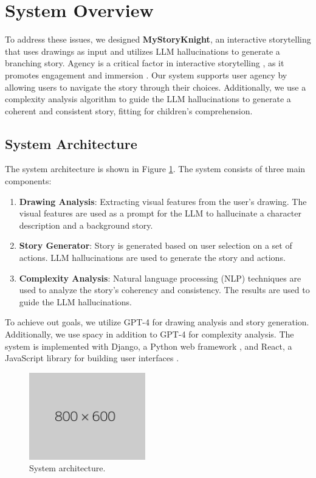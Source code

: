 \documentclass[submit,techrep,english]{ipsj}
\begin{document}
\section{System Overview}
\label{sec:system-overview}
To address these issues, we designed \textbf{MyStoryKnight}, an interactive storytelling that uses drawings as input and utilizes LLM hallucinations to generate a branching story. Agency is a critical factor in interactive storytelling \cite{11:LimaGV20}, as it promotes engagement and immersion \cite{12:ZhangXWYRWYWL22}. Our system supports user agency by allowing users to navigate the story through their choices. Additionally, we use a complexity analysis algorithm to guide the LLM hallucinations to generate a coherent and consistent story, fitting for children's comprehension.

\subsection{System Architecture}
\label{subsec:system-architecture}
The system architecture is shown in Figure \ref{fig:system-architecture}. The system consists of three main components:
\begin{enumerate}
    \item \textbf{Drawing Analysis}: Extracting visual features from the user's drawing. The visual features are used as a prompt for the LLM to hallucinate a character description and a background story.
    \item \textbf{Story Generator}: Story is generated based on user selection on a set of actions. LLM hallucinations are used to generate the story and actions.
    \item \textbf{Complexity Analysis}: Natural language processing (NLP) techniques are used to analyze the story's coherency and consistency. The results are used to guide the LLM hallucinations.
\end{enumerate}
To achieve out goals, we utilize GPT-4 \cite{17:abs-2303-08774} for drawing analysis and story generation. Additionally, we use spacy \cite{18:spacy} in addition to GPT-4 for complexity analysis. The system is implemented with Django, a Python web framework \cite{19:django}, and React, a JavaScript library for building user interfaces \cite{20:react}.

\begin{figure}[t]
    \centering
    \includegraphics[width=0.45\textwidth]{figures/800x600px.png}
    \caption{System architecture.}
    \label{fig:system-architecture}
\end{figure}
\end{document}
